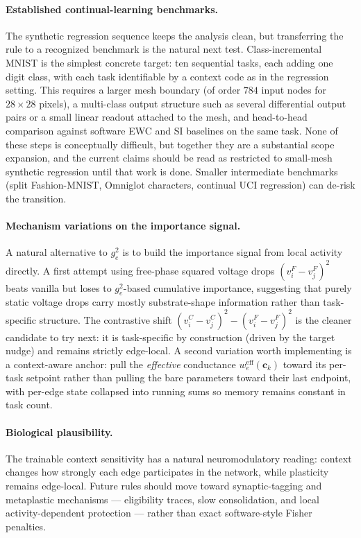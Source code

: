 \documentclass[11pt]{article}
\begin{document}
\paragraph{Established continual-learning benchmarks.}
The synthetic regression sequence keeps the analysis clean, but
transferring the rule to a recognized benchmark is the natural next
test. Class-incremental MNIST is the simplest concrete target: ten
sequential tasks, each adding one digit class, with each task
identifiable by a context code as in the regression setting. This
requires a larger mesh boundary (of order $784$ input nodes for
$28\times 28$ pixels), a multi-class output structure such as several
differential output pairs or a small linear readout attached to the
mesh, and head-to-head comparison against software EWC and SI baselines
on the same task. None of these steps is conceptually difficult, but
together they are a substantial scope expansion, and the current claims
should be read as restricted to small-mesh synthetic regression until
that work is done. Smaller intermediate benchmarks (split
Fashion-MNIST, Omniglot characters, continual UCI regression) can
de-risk the transition.

\paragraph{Mechanism variations on the importance signal.}
A natural alternative to $g_e^2$ is to build the importance signal from
local activity directly. A first attempt using free-phase squared
voltage drops $(v_i^F - v_j^F)^2$ beats vanilla but loses to
$g_e^2$-based cumulative importance, suggesting that purely static
voltage drops carry mostly substrate-shape information rather than
task-specific structure. The contrastive shift
$(v_i^C - v_j^C)^2 - (v_i^F - v_j^F)^2$ is the cleaner candidate to try
next: it is task-specific by construction (driven by the target nudge)
and remains strictly edge-local. A second variation worth implementing
is a context-aware anchor: pull the \emph{effective} conductance
$w_e^{\mathrm{eff}}(\mathbf{c}_k)$ toward its per-task setpoint rather
than pulling the bare parameters toward their last endpoint, with
per-edge state collapsed into running sums so memory remains constant
in task count.

\paragraph{Biological plausibility.}
The trainable context sensitivity has a natural neuromodulatory
reading: context changes how strongly each edge participates in the
network, while plasticity remains edge-local. Future rules should move
toward synaptic-tagging and metaplastic mechanisms --- eligibility
traces, slow consolidation, and local activity-dependent protection ---
rather than exact software-style Fisher penalties.
\end{document}
